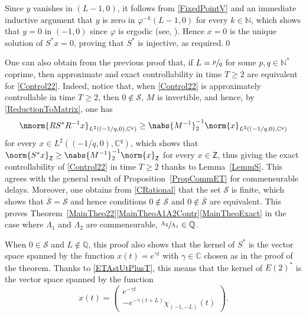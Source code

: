 Since $y$ vanishes in $(L - 1, 0)$, it follows from \eqref{FixedPointV} and an immediate inductive argument that $y$ is zero in $\varphi^{-k}(L-1, 0)$ for every $k \in \mathbb N$, which shows that $y = 0$ in $(-1, 0)$ since $\varphi$ is ergodic (see, \eg \cite[Th.\,1.5]{Walters1982Introduction}). Hence $x = 0$ is the unique solution of $S^\ast x = 0$, proving that $S^\ast$ is injective, as required.\qed

\begin{remk}
\label{RemkControlDelayRational}
One can also obtain from the previous proof that, if $L = \sfrac{p}{q}$ for some $p, q \in \mathbb N^\ast$ coprime, then approximate and exact controllability in time $T \geq 2$ are equivalent for \eqref{Control22}. Indeed, notice that, when \eqref{Control22} is approximately controllable in time $T \geq 2$, then $0 \notin \mathcal S$, $M$ is invertible, and hence, by \eqref{ReductionToMatrix}, one has
\[
\nnorm{R S^\ast R^{-1} x}_{L^2\left(\left(-{1}/{q}, 0\right), \mathbb C^q\right)} \geq \nabs{M^{-1}}_{2}^{-1} \norm{x}_{L^2\left(\left(-{1}/{q}, 0\right), \mathbb C^q\right)}
\]
for every $x \in L^2\left(\left(-{1}/{q}, 0\right), \mathbb C^q\right)$,
which shows that $\norm{S^\ast x}_{\mathsf Z} \geq \nabs{M^{-1}}_{2}^{-1} \norm{x}_{\mathsf Z}$ for \hbox{every} $x \in \mathsf Z$, thus giving the exact controllability of \eqref{Control22} in time $T \geq 2$ thanks to Lemma~\ref{LemmS}. This agrees with the general result of Proposition~\ref{PropCommET} for commensurable delays. Moreover, one obtains from \eqref{CRational} that the set $\mathcal S$ is finite, which shows that $\overline{\mathcal S} = \mathcal S$ and hence conditions $0 \notin \mathcal S$ and $0 \notin \overline{\mathcal S}$ are equivalent. This proves Theorem~\ref{MainTheo22}\eqref{MainTheoA1A2Contr}\eqref{MainTheoExact} in the case where $\Lambda_1$ and $\Lambda_2$ are commensurable, \ie $\sfrac{\Lambda_2}{\Lambda_1} \in \mathbb Q$.
\end{remk}

\begin{remk}
When $0 \in \mathcal S$ and $L \notin \mathbb Q$, this proof also shows that the kernel of $S^\ast$ is the vector space spanned by the function $x(t) = e^{\gamma t}$ with $\gamma \in \mathbb C$ chosen as in the proof of the theorem. Thanks to \eqref{ETAstUtPlusT}, this means that the kernel of $E(2)^\ast$ is the vector space spanned by the function
\[
x(t) =
\begin{pmatrix}
e^{-\gamma t} \\
-e^{-\gamma(t + L)} \chi_{(-1, -L)}(t)
\end{pmatrix}.
\]
\end{remk}

